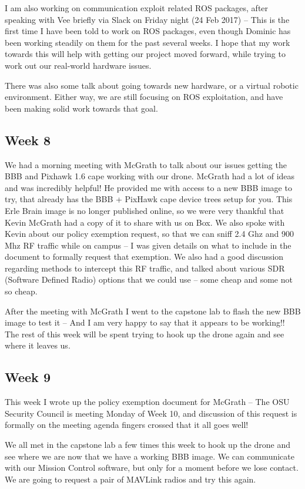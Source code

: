 \documentclass[IEEEtran,letterpaper,10pt,notitlepage,draftclsnofoot,onecolumn]{article}
\begin{document}
  I am also working on communication exploit related ROS packages, after speaking with Vee briefly via Slack on Friday night (24 Feb 2017) -- This is the first time I have been told to work on ROS packages, even though Dominic has been working steadily on them for the past several weeks. I hope that my work towards this will help with getting our project moved forward, while trying to work out our real-world hardware issues.

  There was also some talk about going towards new hardware, or a virtual robotic environment. Either way, we are still focusing on ROS exploitation, and have been making solid work towards that goal.

  \subsection{Week 8}
  We had a morning meeting with McGrath to talk about our issues getting the BBB and Pixhawk 1.6 cape working with our drone. McGrath had a lot of ideas and was incredibly helpful! He provided me with access to a new BBB image to try, that already has the BBB + PixHawk cape device trees setup for you. This Erle Brain image is no longer published online, so we were very thankful that Kevin McGrath had a copy of it to share with us on Box. We also spoke with Kevin about our policy exemption request, so that we can sniff 2.4 Ghz and 900 Mhz RF traffic while on campus -- I was given details on what to include in the document to formally request that exemption. We also had a good discussion regarding methods to intercept this RF traffic, and talked about various SDR (Software Defined Radio) options that we could use -- some cheap and some not so cheap.

  After the meeting with McGrath I went to the capstone lab to flash the new BBB image to test it -- And I am very happy to say that it appears to be working!! The rest of this week will be spent trying to hook up the drone again and see where it leaves us.

  \subsection{Week 9}
  This week I wrote up the policy exemption document for McGrath -- The OSU Security Council is meeting Monday of Week 10, and discussion of this request is formally on the meeting agenda fingers crossed that it all goes well!

  We all met in the capstone lab a few times this week to hook up the drone and see where we are now that we have a working BBB image. We can communicate with our Mission Control software, but only for a moment before we lose contact. We are going to request a pair of MAVLink radios and try this again.
\end{document}
